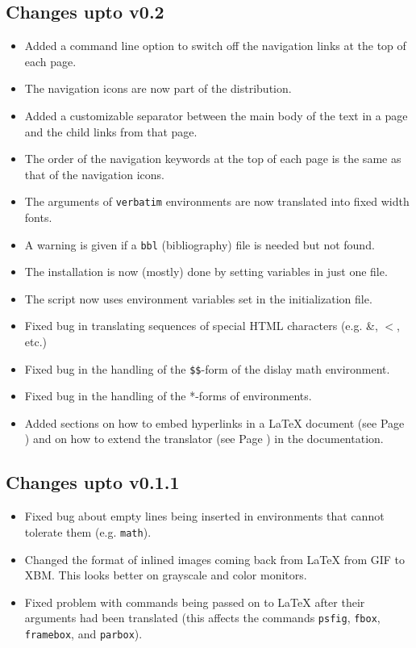 \subsection{Changes upto v0.2}
\begin{itemize}
\item Added a command line option
to switch off the navigation links
at the top of each page.
\item The navigation icons are now part of the distribution.
\item Added a customizable separator between the main body of the text
in a page and the child links from that page.
\item The order of the navigation keywords at the top of each page is
the same as that of the navigation icons.
\item The arguments of \texttt{verbatim} environments are now translated
into fixed width fonts.
\item A warning is given if a \texttt{bbl} (bibliography) file is 
needed but not found.
\item The installation is now (mostly) done by setting variables in 
just one file.
\item The  script now uses environment variables
set in the initialization file.
\item Fixed bug in translating sequences of special HTML characters
(e.g. \&, $<$, etc.)
\item Fixed bug in the handling of the \verb|$$|-form of the dislay
math environment.
\item Fixed bug in the handling of the *-forms of environments.
\item Added sections on how to embed hyperlinks in a LaTeX document 
(see Page \pageref{sec:hyper}) and on how to extend the translator
(see Page \pageref{sec:extend}) in the documentation.
\end{itemize}

\subsection{Changes upto v0.1.1}
\begin{itemize}
\item Fixed bug about empty lines being inserted in environments that
cannot tolerate them (e.g. \texttt{math}).
\item Changed the format of inlined images coming back from LaTeX
from GIF to XBM. This looks better on grayscale and color monitors.
\item Fixed problem with commands being passed on to LaTeX  after
their
arguments had been translated (this affects the commands 
\texttt{psfig}, \texttt{fbox}, \texttt{framebox}, and \texttt{parbox}).
\end{itemize}
